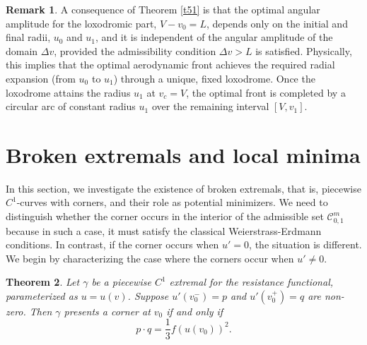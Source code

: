 \documentclass[a4paper,12pt]{amsart}
\newtheorem{theorem}{Theorem}[section]
\theoremstyle{definition}
\newtheorem{remark}[theorem]{Remark}
\begin{document}
 


 \begin{remark}
A consequence of Theorem \ref{t51} is that the optimal angular amplitude for the loxodromic part, $V -v_0=L$, depends only on the initial and final radii, $u_0$ and $u_1$, and it is independent of the angular amplitude of the domain $\Delta v$, provided the admissibility condition $\Delta v > L$ is satisfied. Physically, this implies that the optimal aerodynamic front achieves the required radial expansion (from $u_0$ to $u_1$) through a unique, fixed loxodrome. Once the loxodrome attains the radius $u_1$ at $v_c=V$, the optimal front is completed by  a circular arc of constant radius $u_1$ over the remaining interval $[V,v_1]$. 
\end{remark}
 
 



\section{Broken extremals and local minima}\label{s5}
 

In this section, we investigate the existence of broken extremals, that is, piecewise $C^1$-curves with corners, and their role as potential minimizers. We need to distinguish whether the corner occurs in the interior of the admissible set $\mathcal{C}_{0,1}^m$ because in such a case, it must satisfy the classical Weierstrass-Erdmann conditions. In contrast, if the corner occurs when $u'=0$, the situation is different. We begin by characterizing the case where the corners occur when $u'\not=0$.
 

\begin{theorem}\label{t41} 
Let $\gamma$ be a piecewise $C^1$ extremal for the resistance functional, parameterized as $u=u(v)$. Suppose $u'(v_0^-)=p$ and $u'(v_0^+)=q$ are non-zero.  Then $\gamma$ presents a corner at $v_0$ if and only if 
\begin{equation}\label{we}
p\cdot q = \frac{1}{3}f(u(v_0))^2.
\end{equation}
\end{theorem}
\end{document}
